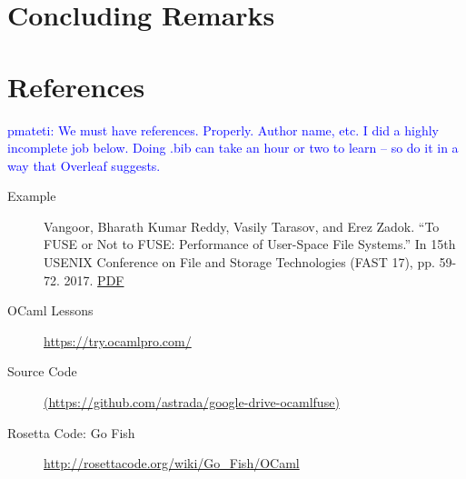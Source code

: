 \documentclass{article}
\newcommand{\PM}[1]{\textcolor{Blue}{pmateti: #1}}%
\begin{document}
\section{Concluding Remarks}

\section{References}

\PM{We must have references.  Properly.  Author name, etc.  I did a
  highly incomplete job below.  Doing .bib can take an hour or two to
  learn -- so do it in a way that Overleaf suggests.}

\begin{description}
  \item [Example] Vangoor, Bharath Kumar Reddy, Vasily Tarasov, and
    Erez Zadok. ``To {FUSE} or Not to {FUSE}: Performance of User-Space
    File Systems.'' In 15th {USENIX} Conference on File and Storage
    Technologies ({FAST} 17), pp. 59-72. 2017. \href{https://www.usenix.org/system/files/conference/fast17/fast17-vangoor.pdf}{PDF}
  \item[OCaml Lessons] \url{https://try.ocamlpro.com/}
  \item[Source Code]
     \url{(https://github.com/astrada/google-drive-ocamlfuse)}
  \item[Rosetta Code: Go Fish] \url{http://rosettacode.org/wiki/Go_Fish/OCaml}
\end{description}
\end{document}
